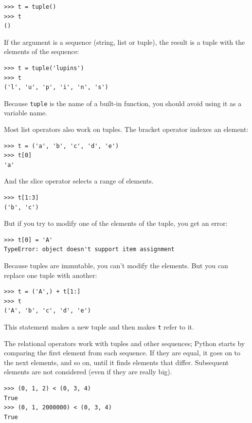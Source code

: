 \documentclass[10pt]{book}
\begin{document}
\begin{verbatim}
>>> t = tuple()
>>> t
()
\end{verbatim}
%
If the argument is a sequence (string, list or tuple), the result
is a tuple with the elements of the sequence:

\begin{verbatim}
>>> t = tuple('lupins')
>>> t
('l', 'u', 'p', 'i', 'n', 's')
\end{verbatim}
%
Because {\tt tuple} is the name of a built-in function, you should
avoid using it as a variable name.

Most list operators also work on tuples.  The bracket operator
indexes an element:

\begin{verbatim}
>>> t = ('a', 'b', 'c', 'd', 'e')
>>> t[0]
'a'
\end{verbatim}
%
And the slice operator selects a range of elements.

\begin{verbatim}
>>> t[1:3]
('b', 'c')
\end{verbatim}
%
But if you try to modify one of the elements of the tuple, you get
an error:

\begin{verbatim}
>>> t[0] = 'A'
TypeError: object doesn't support item assignment
\end{verbatim}
%
Because tuples are immutable, you can't modify the elements.  But you
can replace one tuple with another:

\begin{verbatim}
>>> t = ('A',) + t[1:]
>>> t
('A', 'b', 'c', 'd', 'e')
\end{verbatim}
%
This statement makes a new tuple and then makes {\tt t} refer to it.

The relational operators work with tuples and other sequences;
Python starts by comparing the first element from each
sequence.  If they are equal, it goes on to the next elements,
and so on, until it finds elements that differ.  Subsequent
elements are not considered (even if they are really big).

\begin{verbatim}
>>> (0, 1, 2) < (0, 3, 4)
True
>>> (0, 1, 2000000) < (0, 3, 4)
True
\end{verbatim}
\end{document}
